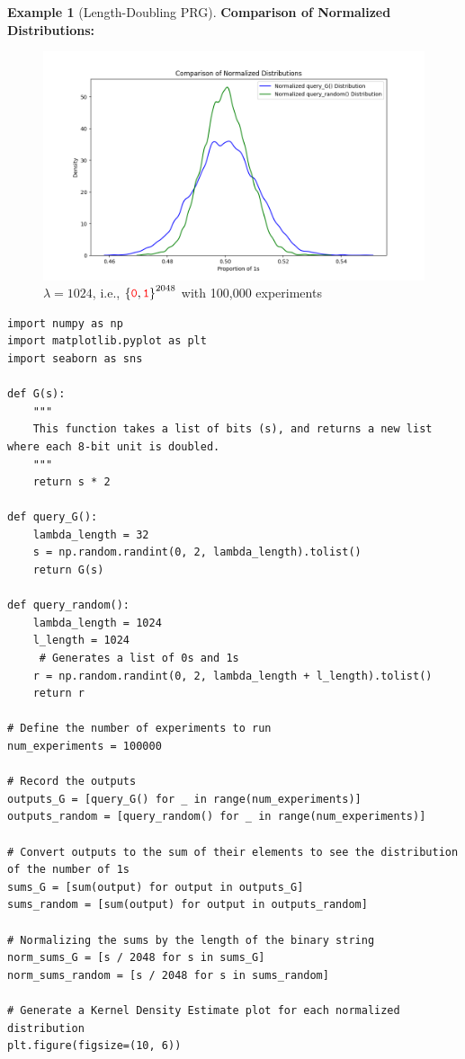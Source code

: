 \documentclass[12pt,openany]{book}
\theoremstyle{definition}
\newtheorem{example}{Example}[chapter]
\newcommand{\ie}{\textnormal{i.e.}}
\newcommand{\zero}{\textcolor{red}{\texttt{0}}}
\newcommand{\one}{\textcolor{red}{\texttt{1}}}
\newcommand{\binaryfield}{\set{\zero,\one}}
\begin{document}
\begin{example}[Length-Doubling PRG]
	\newpage
	\textbf{Comparison of Normalized Distributions:}
	\begin{figure}[h!]\centering
		\includegraphics[width=\textwidth, height=.43\textheight]{query_1024.png}
		\caption{$\lambda=1024$, \ie, $\binaryfield^{2048}$ with 100,000 experiments}
	\end{figure}
	\begin{lstlisting}[style=sage]
import numpy as np
import matplotlib.pyplot as plt
import seaborn as sns

def G(s):
	"""
	This function takes a list of bits (s), and returns a new list where each 8-bit unit is doubled.
	"""
	return s * 2

def query_G():
	lambda_length = 32
	s = np.random.randint(0, 2, lambda_length).tolist()
	return G(s)

def query_random():
	lambda_length = 1024
	l_length = 1024
	 # Generates a list of 0s and 1s
	r = np.random.randint(0, 2, lambda_length + l_length).tolist()
	return r

# Define the number of experiments to run
num_experiments = 100000

# Record the outputs
outputs_G = [query_G() for _ in range(num_experiments)]
outputs_random = [query_random() for _ in range(num_experiments)]

# Convert outputs to the sum of their elements to see the distribution of the number of 1s
sums_G = [sum(output) for output in outputs_G]
sums_random = [sum(output) for output in outputs_random]

# Normalizing the sums by the length of the binary string
norm_sums_G = [s / 2048 for s in sums_G]
norm_sums_random = [s / 2048 for s in sums_random]

# Generate a Kernel Density Estimate plot for each normalized distribution
plt.figure(figsize=(10, 6))


\end{lstlisting}
\end{example}
\end{document}
